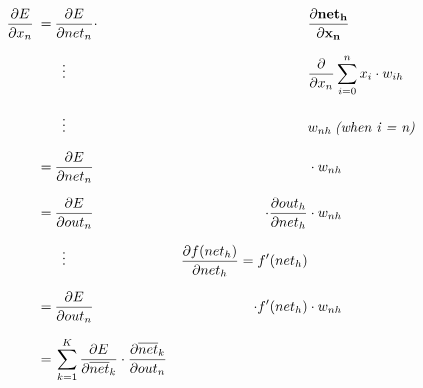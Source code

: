 \documentclass[12pt]{article}
\begin{document}
\begin{equation}
    \begin{aligned}
        \frac{\partial E}{\partial x_{n}} \:=\: & \frac{\partial E}{\partial net_{n}} \cdot                                                            &                                                              & \mathbf{ \frac{\partial net_{h}}{\partial x_{n}} }               \\[0.68em]
                                                & \mathrel{\makebox[\widthof{=}]{\vdots}}                                                              &                                                              & \frac{\partial}{\partial x_{n}} \sum_{i=0}^{n}x_{i} \cdot w_{ih} \\[0.68em]
                                                & \mathrel{\makebox[\widthof{=}]{\vdots}}                                                              &                                                              & w_{nh} \: \textit{(when i = n)}                                  \\[0.68em]
                                          \:=\: & \frac{\partial E}{\partial net_{n}}                                                                  &                                                              & \cdot w_{nh}                                                     \\[0.68em]
                                          \:=\: & \frac{\partial E}{\partial out_{n}}                                                                  & \cdot \frac{\partial out_{h}}{\partial net_{h}}              & \cdot w_{nh}                                                     \\[0.68em]
                                                & \mathrel{\makebox[\widthof{=}]{\vdots}}                                                              & \frac{\partial f(net_{h})}{\partial net_{h}} = f'(net_{h})   &                                                                  \\[0.68em]
                                          \:=\: & \frac{\partial E}{\partial out_{n}}                                                                  & \cdot f'(net_{h})                                            & \cdot w_{nh}                                                     \\[0.68em]
                                          \:=\: & \sum_{k=1}^{K} \frac{\partial E}{\partial \overline{net}_{k}} \cdot \frac{\partial \overline{net}_{k}}{\partial out_{n}}   &                                                              &                                                                  \\[0.68em]

\end{aligned}
\end{equation}
\end{document}
